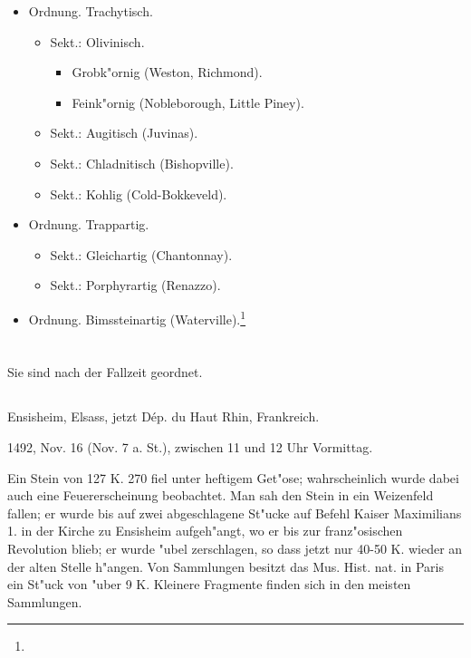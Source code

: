 \documentclass[a4paper, 11pt, oneside]{article}
\begin{document}
\begin{itemize}
    \item[1.] Ordnung. Trachytisch.
    \begin{itemize}
        \item[1.] Sekt.: Olivinisch.
        \begin{itemize}
            \item[a.] Grobk"ornig (Weston, Richmond).
            \item[b.] Feink"ornig (Nobleborough, Little Piney).
        \end{itemize}
        \item[2.] Sekt.: Augitisch (Juvinas).
        \item[3.] Sekt.: Chladnitisch (Bishopville).
        \item[4.] Sekt.: Kohlig (Cold-Bokkeveld).
    \end{itemize}
    \item[2.] Ordnung. Trappartig.
    \begin{itemize}
        \item[1.] Sekt.: Gleichartig (Chantonnay).
        \item[2.] Sekt.: Porphyrartig (Renazzo).
    \end{itemize}
    \item[3.] Ordnung. Bimssteinartig (Waterville).\footnote{}
\end{itemize}
\clearpage
\section{}
\paragraph{}
Sie sind nach der Fallzeit geordnet.
\subsection{}
\paragraph{}
Ensisheim, Elsass, jetzt Dép. du Haut Rhin, Frankreich.

1492, Nov. 16 (Nov. 7 a. St.), zwischen 11 und 12 Uhr Vormittag.

Ein Stein von 127 K. 270 fiel unter heftigem Get"ose; wahrscheinlich wurde dabei auch eine Feuererscheinung beobachtet. Man sah den Stein in ein Weizenfeld fallen; er wurde bis auf zwei abgeschlagene St"ucke auf Befehl Kaiser Maximilians 1. in der Kirche zu Ensisheim aufgeh"angt, wo er bis zur franz"osischen Revolution blieb; er wurde "ubel zerschlagen, so dass jetzt nur 40-50 K. wieder an der alten Stelle h"angen. Von Sammlungen besitzt das Mus. Hist. nat. in Paris ein St"uck von "uber 9 K. Kleinere Fragmente finden sich in den meisten Sammlungen.
\end{document}
